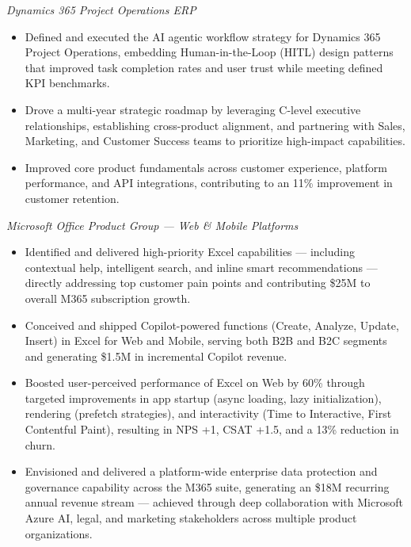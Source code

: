 \documentclass{article}
\newcommand{\role}[2]{%
    \vspace{4pt}%
    {\textit{#1} \hfill \textit{#2}}\par%
    \vspace{1pt}%
}
\begin{document}
\role{Dynamics 365 Project Operations ERP}{}
\begin{itemize}
    \item Defined and executed the AI agentic workflow strategy for Dynamics 365 Project Operations, embedding Human-in-the-Loop (HITL) design patterns that improved task completion rates and user trust while meeting defined KPI benchmarks.

    \item Drove a multi-year strategic roadmap by leveraging C-level executive relationships, establishing cross-product alignment, and partnering with Sales, Marketing, and Customer Success teams to prioritize high-impact capabilities.

    \item Improved core product fundamentals across customer experience, platform performance, and API integrations, contributing to an 11\% improvement in customer retention.
\end{itemize}

\role{Microsoft Office Product Group — Web \& Mobile Platforms}{}
\begin{itemize}
    \item Identified and delivered high-priority Excel capabilities — including contextual help, intelligent search, and inline smart recommendations — directly addressing top customer pain points and contributing \$25M to overall M365 subscription growth.

    \item Conceived and shipped Copilot-powered functions (Create, Analyze, Update, Insert) in Excel for Web and Mobile, serving both B2B and B2C segments and generating \$1.5M in incremental Copilot revenue.

    \item Boosted user-perceived performance of Excel on Web by 60\% through targeted improvements in app startup (async loading, lazy initialization), rendering (prefetch strategies), and interactivity (Time to Interactive, First Contentful Paint), resulting in NPS +1, CSAT +1.5, and a 13\% reduction in churn.

    \item Envisioned and delivered a platform-wide enterprise data protection and governance capability across the M365 suite, generating an \$18M recurring annual revenue stream — achieved through deep collaboration with Microsoft Azure AI, legal, and marketing stakeholders across multiple product organizations.
\end{itemize}
\end{document}
